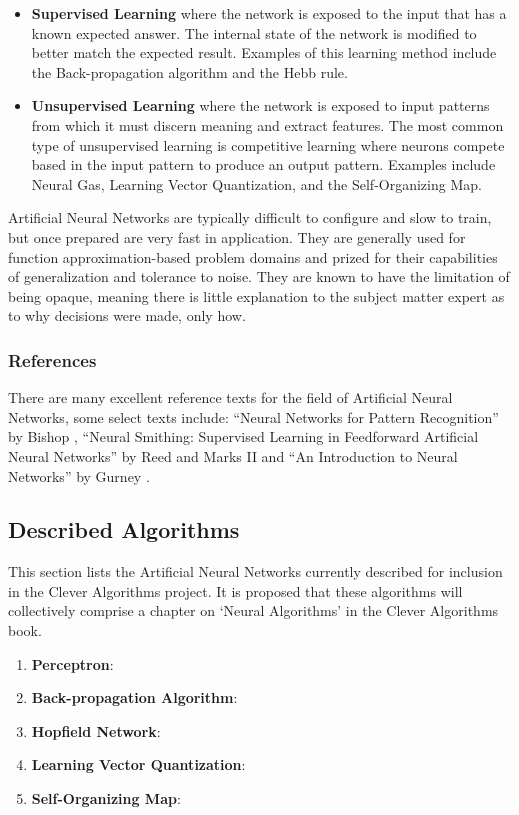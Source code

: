 \documentclass[a4paper, 11pt]{article}
\begin{document}
\begin{itemize}
	\item \textbf{Supervised Learning} where the network is exposed to the input that has a known expected answer. The internal state of the network is modified to better match the expected result. Examples of this learning method include the Back-propagation algorithm and the Hebb rule.
	\item \textbf{Unsupervised Learning} where the network is exposed to input patterns from which it must discern meaning and extract features. The most common type of unsupervised learning is competitive learning where neurons compete based in the input pattern to produce an output pattern. Examples include Neural Gas, Learning Vector Quantization, and the Self-Organizing Map.
\end{itemize}

Artificial Neural Networks are typically difficult to configure and slow to train, but once prepared are very fast in application. They are generally used for function approximation-based problem domains and prized for their capabilities of generalization and tolerance to noise. They are known to have the limitation of being opaque, meaning there is little explanation to the subject matter expert as to why decisions were made, only how.

\subsubsection{References}
There are many excellent reference texts for the field of Artificial Neural Networks, some select texts include: ``Neural Networks for Pattern Recognition'' by Bishop \cite{Bishop1995}, ``Neural Smithing: Supervised Learning in Feedforward Artificial Neural Networks'' by Reed and Marks II \cite{Reed1999} and ``An Introduction to Neural Networks'' by Gurney \cite{Gurney1997}.

% 
% 
\subsection{Described Algorithms}
\label{subsec:algorithms}
This section lists the Artificial Neural Networks currently described for inclusion in the Clever Algorithms project. It is proposed that these algorithms will collectively comprise a chapter on `Neural Algorithms' in the Clever Algorithms book. 

\begin{enumerate}
	\item \textbf{Perceptron}: \cite{Brownlee2010af}
	\item \textbf{Back-propagation Algorithm}: \cite{Brownlee2010ag}
	\item \textbf{Hopfield Network}: \cite{Brownlee2010ah}
	\item \textbf{Learning Vector Quantization}: \cite{Brownlee2010ai}
	\item \textbf{Self-Organizing Map}: \cite{Brownlee2010aj}
\end{enumerate}
\end{document}
